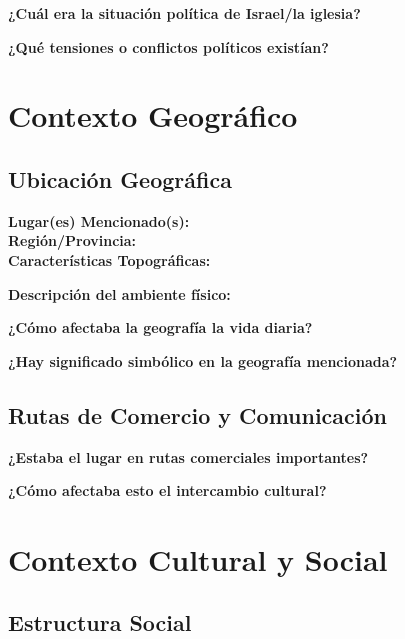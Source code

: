 \documentclass[11pt,a4paper]{article}
\begin{document}
\textbf{¿Cuál era la situación política de Israel/la iglesia?}
\vspace{2cm}

\textbf{¿Qué tensiones o conflictos políticos existían?}
\vspace{2cm}

\newpage

\section{Contexto Geográfico}

\subsection{Ubicación Geográfica}

\begin{historybox}
\textbf{Lugar(es) Mencionado(s):} \hspace{8cm}\\[0.5cm]
\textbf{Región/Provincia:} \hspace{8cm}\\[0.5cm]
\textbf{Características Topográficas:} \hspace{8cm}
\end{historybox}

\textbf{Descripción del ambiente físico:}
\vspace{2cm}

\textbf{¿Cómo afectaba la geografía la vida diaria?}
\vspace{2cm}

\textbf{¿Hay significado simbólico en la geografía mencionada?}
\vspace{2cm}

\subsection{Rutas de Comercio y Comunicación}

\textbf{¿Estaba el lugar en rutas comerciales importantes?}
\vspace{1.5cm}

\textbf{¿Cómo afectaba esto el intercambio cultural?}
\vspace{1.5cm}

\section{Contexto Cultural y Social}

\subsection{Estructura Social}
\end{document}
